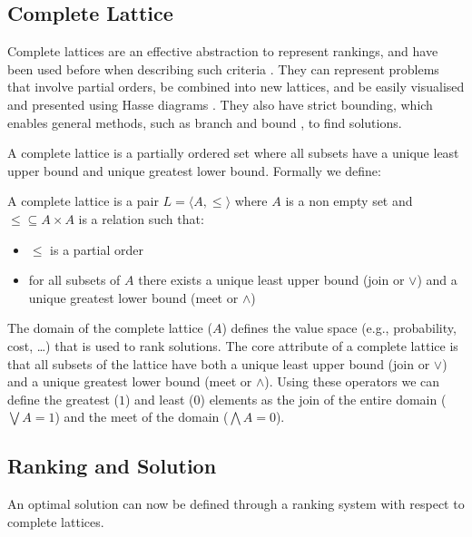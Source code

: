 \subsection{Complete Lattice}
Complete lattices are an effective abstraction to represent rankings,
and have been used before when describing such criteria \cite{Bistarelli1997,Fernandez}.
They can represent problems that involve partial orders,
be combined into new lattices,
and be easily visualised and presented using Hasse diagrams \cite{davey1990introduction}.
They also have strict bounding, which enables general methods, such as branch and bound \cite{Land1960}, to find solutions.

A complete lattice is a partially ordered set where all subsets have a unique least upper bound and unique greatest lower bound.
Formally we define:
\begin{defs}
A complete lattice is a pair $L = \langle A, \leq \rangle$ where $A$ is a non empty set 
and $\leq \subseteq A \times A$ is a relation such that:
\begin{itemize}
  \item $\leq$ is a partial order
  \item for all subsets of $A$ there exists a unique least upper bound (join or $\vee$) and a unique greatest lower bound (meet or $\wedge$)
\end{itemize}
\end{defs}

The domain of the complete lattice ($A$) defines the value space (e.g., probability, cost, \ldots) 
that is used to rank solutions. 
The core attribute of a complete lattice is that all subsets of the lattice have both a unique least upper bound (join or $\vee$) 
and a unique greatest lower bound (meet or $\wedge$).
Using these operators we can define the greatest ($1$) and least ($0$) elements as
the join of the entire domain ($\bigvee A = 1$) and the meet of the domain ($\bigwedge A = 0$).

\subsection{Ranking and Solution}
An optimal solution can now be defined through a ranking system with respect to complete lattices.

